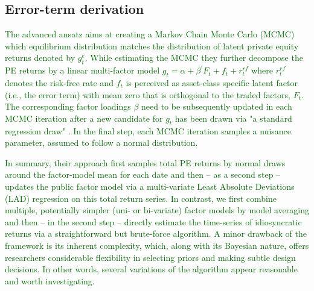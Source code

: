 \subsection{Error-term derivation}

\textcolor{darkgreen}{
	The advanced \cite{ACGP18} ansatz aims at creating a Markov Chain Monte Carlo (MCMC) which equilibrium distribution matches the distribution of latent private equity returns denoted by $g_t^e$.
	While estimating the MCMC they further decompose the PE returns by a linear multi-factor model $g_t = \alpha + \beta^{'} F_t + f_t + r_t^{rf}$ where $ r_t^{rf}$ denotes the risk-free rate and $f_t$ is perceived as asset-class specific latent factor (i.e., the error term) with mean zero that is orthogonal to the traded factors, $F_t$.
	The corresponding factor loadings $\beta$ need to be subsequently updated in each MCMC iteration after a new candidate for $g_t$ has been drawn via "a standard regression draw" \cite[internet appendix, p.4]{ACGP18}.
	In the final step, each MCMC iteration samples a nuisance parameter, assumed to follow a normal distribution. 
}

\textcolor{darkgreen}{
	In summary, their approach first samples total PE returns by normal draws around the factor-model mean for each date and then -- as a second step -- updates the public factor model via a multi-variate Least Absolute Deviations (LAD) regression on this total return series.
	In contrast, we first combine multiple, potentially simpler (uni- or bi-variate) factor models by model averaging and then -- in the second step -- directly estimate the time-series of idiosyncratic returns via a straightforward but brute-force algorithm.
	A minor drawback of the \cite{ACGP18} framework is its inherent complexity, which, along with its Bayesian nature, offers researchers considerable flexibility in selecting priors and making subtle design decisions.
	In other words, several variations of the \cite{ACGP18} algorithm appear reasonable and worth investigating.
}
